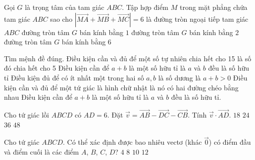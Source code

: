 \begin{ex}%
Gọi $ G $	 là trọng tâm của tam giác $ ABC $. Tập hợp điểm $ M $ trong mặt phẳng chứa tam giác $ ABC $ sao cho $ \left| \overrightarrow{MA} + \overrightarrow{MB}+ \overrightarrow{MC}\right|=6$ là
\choice
{đường tròn ngoại tiếp tam giác $ ABC $}
{đường tròn tâm $ G $ bán kính bằng $ 1 $}
{\True đường tròn tâm $ G $ bán kính bằng $ 2 $}
{đường tròn tâm $ G $ bán kính bằng $ 6 $}
\end{ex}

\begin{ex}%
Tìm mệnh đề đúng.
\choice
{Điều kiện cần và đủ để một số tự nhiên chia hết cho 15 là số đó chia hết cho 5}
{\True Điều kiện cần để $a+b$ là một số hữu tỉ là $a$ và $b$ đều là số hữu tỉ}
{Điều kiện đủ để có ít nhất một trong hai số $a, b$ là số dương là $a+b>0$}
{ Điều kiện cần và đủ để một tứ giác là hình chữ nhật là nó có hai đường chéo bằng nhau}
\loigiai
{ Điều kiện cần để $a+b$ là một số hữu tỉ là $a$ và $b$ đều là số hữu tỉ.
}
\end{ex}

\begin{ex}%
 	Cho tứ giác lồi $ABCD$ có $AD=6$. Đặt $\overrightarrow{v}=\overrightarrow{AB}-\overrightarrow{DC}-\overrightarrow{CB}$. Tính $\overrightarrow{v} \cdot \overrightarrow{AD}$.
 	\choice
 	{$18$}
 	{$24$}
 	{\True $36$}
 	{$48$}
 \end{ex}

\begin{ex}%
 	Cho tứ giác $ ABCD $. Có thể xác định được bao nhiêu vectơ (khác $ \overrightarrow{0} $) có điểm đầu và điểm cuối là các điểm $ A $, $ B $, $ C $, $ D $?
 	\choice
 	{$ 4 $}
 	{$ 8 $}
 	{$ 10 $}
 	{\True $ 12 $}
\end{ex}

